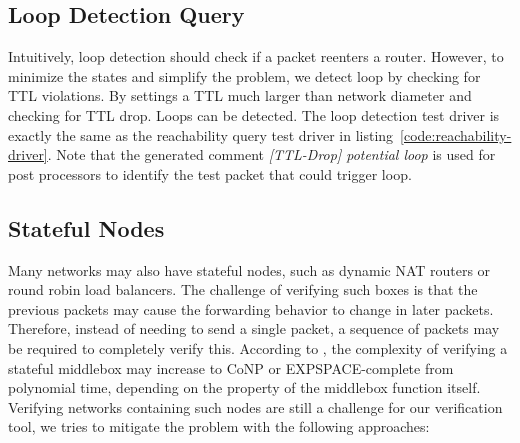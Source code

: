 \documentclass[letterpaper, 10 pt, conference]{ieeeconf}  %
\begin{document}
\subsection{Loop Detection Query}
Intuitively, loop detection should check if a packet reenters a router. However, to minimize the states and simplify the problem, we detect loop by checking for TTL violations. By settings a TTL much larger than network diameter and checking for TTL drop. Loops can be detected. The loop detection test driver is exactly the same as the reachability query test driver in listing~\ref{code:reachability-driver}. Note that the generated comment \emph{[TTL-Drop] potential loop} is used for post processors to identify the test packet that could trigger loop.

\subsection{Stateful Nodes}
Many networks may also have stateful nodes, such as dynamic NAT routers or round robin load balancers. 
The challenge of verifying such boxes is that the previous packets may cause the forwarding behavior to change in later packets. 
Therefore, instead of needing to send a single packet, a sequence of packets may be required to completely verify this. 
According to \cite{stateful_verification_complexity}, the complexity of verifying a stateful middlebox may increase to CoNP or EXPSPACE-complete from polynomial time, depending on the property of the middlebox function itself. 
Verifying networks containing such nodes are still a challenge for our verification tool\cite{stateful_verification_complexity}, we tries to mitigate the problem with the following approaches:
\end{document}

